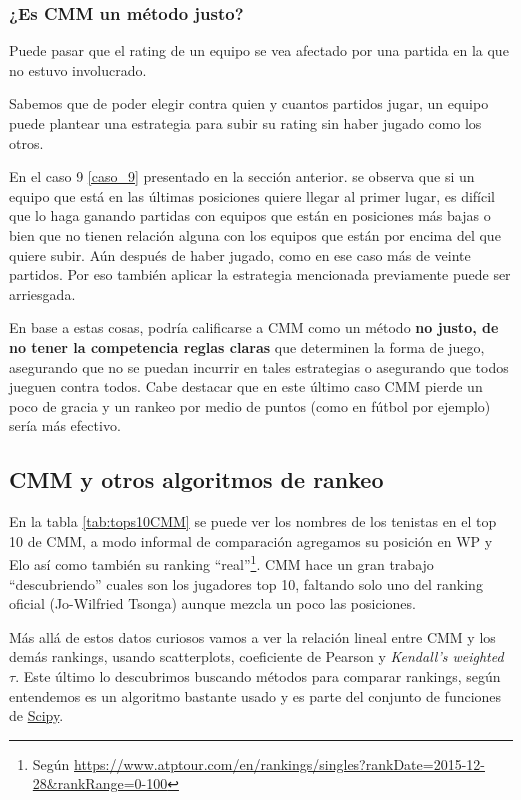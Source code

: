 \subsubsection{¿Es CMM un método justo?}

Puede pasar que el rating de un equipo se vea afectado por una partida en la que no estuvo involucrado.

Sabemos que de poder elegir contra quien y cuantos partidos jugar, un equipo puede plantear una estrategia para subir su rating sin haber jugado como los otros.

En el caso 9 \ref{caso_9} presentado en la sección anterior. se observa que si un equipo que está en las últimas posiciones quiere llegar al primer lugar, es difícil que lo haga ganando partidas con equipos que están en posiciones más bajas o bien que no tienen relación alguna con los equipos que están por encima del que quiere subir. Aún después de haber jugado, como en ese caso más de veinte partidos. Por eso también aplicar la estrategia mencionada previamente puede ser arriesgada.

En base a estas cosas, podría calificarse a CMM como un método \textbf{no  justo, de no tener la competencia reglas claras} que determinen la forma de juego, asegurando que no se puedan incurrir en tales estrategias o asegurando que todos jueguen contra todos. Cabe destacar que en este último caso CMM pierde un poco de gracia y un rankeo por medio de puntos (como en fútbol por ejemplo) sería más efectivo.

\FloatBarrier
\subsection{CMM y otros algoritmos de rankeo}\label{cmm_comparacion}
En la tabla \ref{tab:tops10CMM} se puede ver los nombres de los tenistas en el top 10 de CMM, a modo informal de comparación agregamos su posición en WP y Elo así como también su ranking ``real''\footnote{Según \url{https://www.atptour.com/en/rankings/singles?rankDate=2015-12-28&rankRange=0-100}}. CMM hace un gran trabajo ``descubriendo'' cuales son los jugadores top 10, faltando solo uno del ranking oficial (Jo-Wilfried Tsonga) aunque mezcla un poco las posiciones.



Más allá de estos datos curiosos vamos a ver la relación lineal entre CMM y los demás rankings, usando scatterplots, coeficiente de Pearson y \textit{Kendall’s weighted $\tau$}. Este último lo descubrimos buscando métodos para comparar rankings, según entendemos es un algoritmo bastante usado y es parte del conjunto de funciones de \href{https://docs.scipy.org/doc/scipy/reference/generated/scipy.stats.weightedtau.html}{Scipy}.

